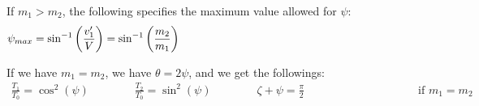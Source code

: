 \documentclass[9pt,oneside]{book}
\theoremstyle{break}
\theoremstyle{break}
\begin{document}
If $m_1 > m_2$, the following specifies the maximum value allowed for $\psi$:
\begin{align*}
\psi_{max} = \sin^{-1}\left(\frac{v_1'}{V} \right)=\sin^{-1}\left(\frac{m_2}{m_1} \right) \hspace{7.5cm}
\end{align*}


If we have $m_1 = m _2$, we have $\theta = 2\psi$, and we get the followings:
\begin{align*}
\frac{T_1}{T_0} = \cos^2 (\psi) \qquad\qquad  \frac{T_2}{T_0} = \sin^2(\psi) \qquad\qquad \zeta + \psi = \frac{\pi}{2}\qquad\qquad\qquad\qquad\qquad \text{if }m_1= m_2
\end{align*}
\end{document}
